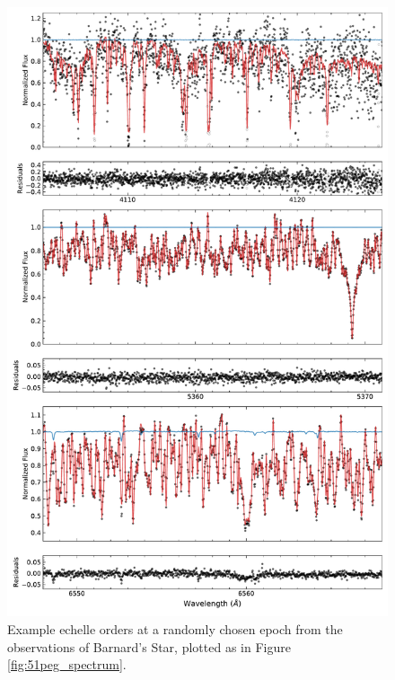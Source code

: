 \documentclass[modern]{aastex62}
\begin{document}
{\begin{figure}
\centering
\includegraphics[width=5.5in]{barnards_multispectrum}
\caption{Example echelle orders at a randomly chosen epoch from the \HARPS observations of Barnard's Star, plotted as in Figure \ref{fig:51peg_spectrum}.}
\label{fig:barnards_spectrum}
\end{figure}

}
\end{document}
